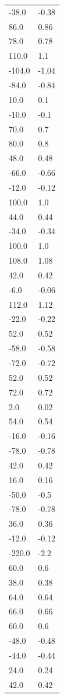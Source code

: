 \begin{longtable}{ll}
-38.0 & -0.38 \\
86.0 & 0.86 \\
78.0 & 0.78 \\
110.0 & 1.1 \\
-104.0 & -1.04 \\
-84.0 & -0.84 \\
10.0 & 0.1 \\
-10.0 & -0.1 \\
70.0 & 0.7 \\
80.0 & 0.8 \\
48.0 & 0.48 \\
-66.0 & -0.66 \\
-12.0 & -0.12 \\
100.0 & 1.0 \\
44.0 & 0.44 \\
-34.0 & -0.34 \\
100.0 & 1.0 \\
108.0 & 1.08 \\
42.0 & 0.42 \\
-6.0 & -0.06 \\
112.0 & 1.12 \\
-22.0 & -0.22 \\
52.0 & 0.52 \\
-58.0 & -0.58 \\
-72.0 & -0.72 \\
52.0 & 0.52 \\
72.0 & 0.72 \\
2.0 & 0.02 \\
54.0 & 0.54 \\
-16.0 & -0.16 \\
-78.0 & -0.78 \\
42.0 & 0.42 \\
16.0 & 0.16 \\
-50.0 & -0.5 \\
-78.0 & -0.78 \\
36.0 & 0.36 \\
-12.0 & -0.12 \\
-220.0 & -2.2 \\
60.0 & 0.6 \\
38.0 & 0.38 \\
64.0 & 0.64 \\
66.0 & 0.66 \\
60.0 & 0.6 \\
-48.0 & -0.48 \\
-44.0 & -0.44 \\
24.0 & 0.24 \\
42.0 & 0.42 \\

\end{longtable}
